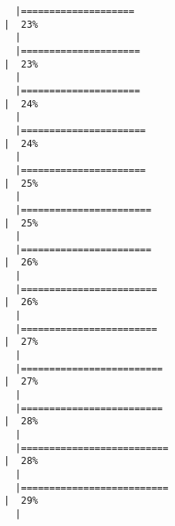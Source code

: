 \documentclass[12pt]{article}
\begin{document}
\begin{verbatim}
  |====================                                                                      |  23%
  |                                                                                                
  |=====================                                                                     |  23%
  |                                                                                                
  |=====================                                                                     |  24%
  |                                                                                                
  |======================                                                                    |  24%
  |                                                                                                
  |======================                                                                    |  25%
  |                                                                                                
  |=======================                                                                   |  25%
  |                                                                                                
  |=======================                                                                   |  26%
  |                                                                                                
  |========================                                                                  |  26%
  |                                                                                                
  |========================                                                                  |  27%
  |                                                                                                
  |=========================                                                                 |  27%
  |                                                                                                
  |=========================                                                                 |  28%
  |                                                                                                
  |==========================                                                                |  28%
  |                                                                                                
  |==========================                                                                |  29%
  |                                                                                                

\end{verbatim}
\end{document}
